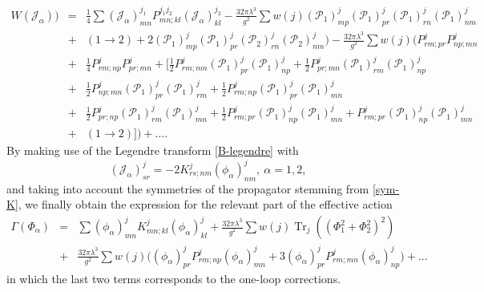 \documentclass[a4paper,11pt,twoside]{article}
\numberwithin{equation}{section}
\DeclareMathOperator{\tr}{Tr}
\theoremstyle{nonumberplain}
\newcounter{and}
\begin{document}
\begin{eqnarray}
W(\mathcal{J}_\alpha))&=&\frac{1}{4}\sum(\mathcal{J}_\alpha)^{j_1}_{mn}P^{j_1j_2}_{mn;kl}(\mathcal{J}_\alpha)^{j_2}_{kl}-\frac{32\pi\lambda^3}{g^2}\sum w(j)(\mathcal{P}_1)^j_{mp}(\mathcal{P}_1)^j_{pr}(\mathcal{P}_1)^j_{rn}(\mathcal{P}_1)^j_{nm}\nonumber\\
&+&(1\to2)+2(\mathcal{P}_1)^j_{mp}(\mathcal{P}_1)^j_{pr}(\mathcal{P}_2)^j_{rn}(\mathcal{P}_2)^j_{nm})-\frac{32\pi\lambda^3}{g^2}\sum w(j)(P^j_{rm;pr}P^j_{np;mn}\nonumber\\
&+&\frac{1}{4}P^j_{rm;np}P^j_{pr;mn}
+[\frac{1}{2}P^j_{rm;mn} (\mathcal{P}_1)^j_{pr}(\mathcal{P}_1)^j_{np}+\frac{1}{2}P^j_{pr;mn} (\mathcal{P}_1)^j_{rm}(\mathcal{P}_1)^j_{np}\nonumber\\
&+&\frac{1}{2}P^j_{np;mn} (\mathcal{P}_1)^j_{pr}(\mathcal{P}_1)^j_{rm}+ \frac{1}{2}P^j_{rm;np} (\mathcal{P}_1)^j_{pr}(\mathcal{P}_1)^j_{mn}\nonumber\\
&+&\frac{1}{2}P^j_{pr;np} (\mathcal{P}_1)^j_{rm}(\mathcal{P}_1)^j_{mn}+\frac{1}{2}P^j_{rm;pr} (\mathcal{P}_1)^j_{np}(\mathcal{P}_1)^j_{mn}+P^j_{rm;pr} (\mathcal{P}_1)^j_{np}(\mathcal{P}_1)^j_{mn}\nonumber\\
&+&(1\to2)])+...\label{B-fullW}.
\end{eqnarray}
By making use of the Legendre transform \eqref{B-legendre} with
\begin{equation}
(\mathcal{J}_\alpha)^j_{sr}=-2K^j_{rs;nm}(\phi_\alpha)^j_{nm},\ \alpha=1,2\label{source-loworder},
\end{equation}
and taking into account the symmetries of the propagator stemming from \eqref{sym-K}, we finally obtain the expression for the relevant part of the effective action 
\begin{eqnarray}
\Gamma(\Phi_\alpha)&=&\sum(\phi_\alpha)^j_{mn}K^j_{mn;kl}(\phi_\alpha)^j_{kl}+\frac{32\pi\lambda^3}{g^2}\sum w(j)\tr_j((\Phi_1^2+\Phi_2^2)^2)\nonumber\\
&+&\frac{32\pi\lambda^3}{g^2}\sum w(j)\big((\phi_\alpha)^j_{pr}P^j_{rm;np}(\phi_\alpha)^j_{mn}+3(\phi_\alpha)^j_{pr}P^j_{rm;mn}(\phi_\alpha)^j_{np} \big)+...\label{B-Gamma}
\end{eqnarray}
in which the last two terms corresponds to the one-loop corrections.
\small
\end{document}
